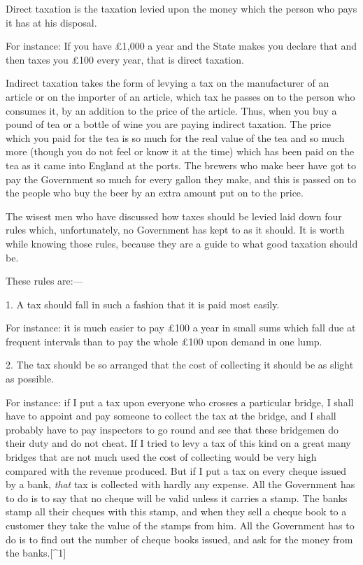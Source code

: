\documentclass{book}
\begin{document}
Direct taxation is the taxation levied upon the money which the person who pays it has at his disposal.

For instance: If you have £1,000 a year and the State makes you declare that and then taxes you £100 every year, that is direct taxation.

Indirect taxation takes the form of levying a tax on the manufacturer of an article or on the importer of an article, which tax he passes on to the person who consumes it, by an addition to the price of the article. Thus, when you buy a pound of tea or a bottle of wine you are paying indirect taxation. The price which you paid for the tea is so much for the real value of the tea and so much more (though you do not feel or know it at the time) which has been paid on the tea as it came into England at the ports. The brewers who make beer have got to pay the Government so much for every gallon they make, and this is passed on to the people who buy the beer by an extra amount put on to the price.

The wisest men who have discussed how taxes should be levied laid down four rules which, unfortunately, no Government has kept to as it should. It is worth while knowing those rules, because they are a guide to what good taxation should be.

These rules are:—

1. A tax should fall in such a fashion that it is paid most easily.

For instance: it is much easier to pay £100 a year in small sums which fall due at frequent intervals than to pay the whole £100 upon demand in one lump.

2. The tax should be so arranged that the cost of collecting it should be as slight as possible.

For instance: if I put a tax upon everyone who crosses a particular bridge, I shall have to appoint and pay someone to collect the tax at the bridge, and I shall probably have to pay inspectors to go round and see that these bridgemen do their duty and do not cheat. If I tried to levy a tax of this kind on a great many bridges that are not much used the cost of collecting would be very high compared with the revenue produced. But if I put a tax on every cheque issued by a bank, \emph{that} tax is collected with hardly any expense. All the Government has to do is to say that no cheque will be valid unless it carries a stamp. The banks stamp all their cheques with this stamp, and when they sell a cheque book to a customer they take the value of the stamps from him. All the Government has to do is to find out the number of cheque books issued, and ask for the money from the banks.{[}\textasciicircum{}1{]}
\end{document}
